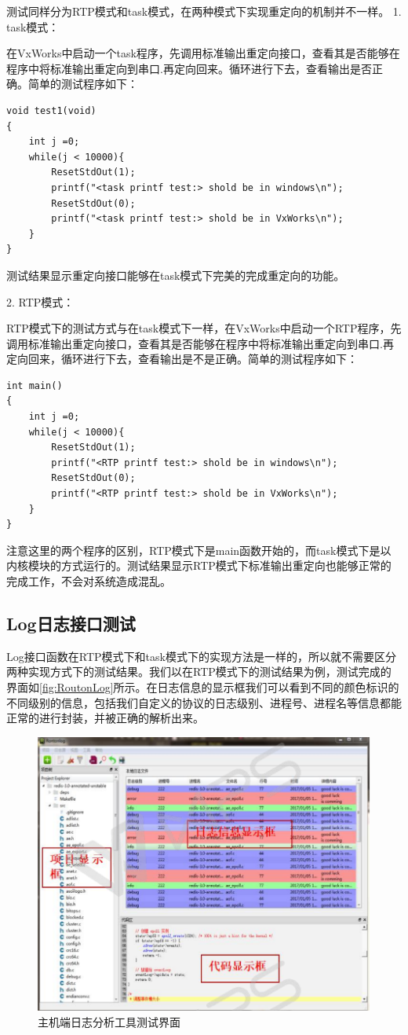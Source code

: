 测试同样分为RTP模式和task模式，在两种模式下实现重定向的机制并不一样。
1. task模式：

	在VxWorks中启动一个task程序，先调用标准输出重定向接口，查看其是否能够在程序中将标准输出重定向到串口.再定向回来。循环进行下去，查看输出是否正确。简单的测试程序如下：
\lstset{language=C}
\begin{lstlisting}
void test1(void)
{
	int j =0;
	while(j < 10000){
		ResetStdOut(1);
		printf("<task printf test:> shold be in windows\n");		
		ResetStdOut(0);
		printf("<task printf test:> shold be in VxWorks\n");
	}
}
\end{lstlisting}
测试结果显示重定向接口能够在task模式下完美的完成重定向的功能。

2. RTP模式：
	
	RTP模式下的测试方式与在task模式下一样，在VxWorks中启动一个RTP程序，先调用标准输出重定向接口，查看其是否能够在程序中将标准输出重定向到串口.再定向回来，循环进行下去，查看输出是不是正确。简单的测试程序如下：
\lstset{language=C}
\begin{lstlisting}
int main()
{
	int j =0;
	while(j < 10000){
		ResetStdOut(1);
		printf("<RTP printf test:> shold be in windows\n");		
		ResetStdOut(0);
		printf("<RTP printf test:> shold be in VxWorks\n");
	}
}
\end{lstlisting}
注意这里的两个程序的区别，RTP模式下是main函数开始的，而task模式下是以内核模块的方式运行的。测试结果显示RTP模式下标准输出重定向也能够正常的完成工作，不会对系统造成混乱。

\subsection{Log日志接口测试}
	Log接口函数在RTP模式下和task模式下的实现方法是一样的，所以就不需要区分两种实现方式下的测试结果。我们以在RTP模式下的测试结果为例，测试完成的界面如\autoref{fig:RoutonLog}所示。在日志信息的显示框我们可以看到不同的颜色标识的不同级别的信息，包括我们自定义的协议的日志级别、进程号、进程名等信息都能正常的进行封装，并被正确的解析出来。
\begin{figure}[!h]
\centering
\includegraphics[width=1.0\textwidth]{./graphics/routonLogRun.pdf}
\caption{主机端日志分析工具测试界面}\label{fig:RoutonLog}
\end{figure}

